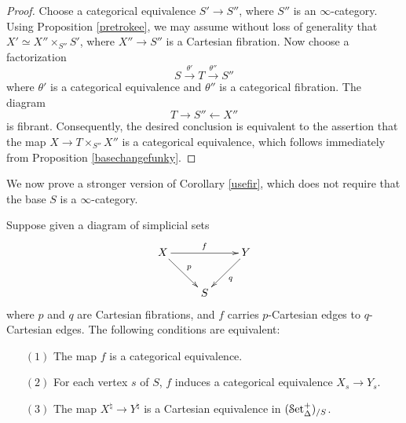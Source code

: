 \begin{proof}
Choose a categorical equivalence $S' \rightarrow S''$, where $S''$ is an $\infty$-category.
Using Proposition \ref{pretrokee}, we may assume without loss of generality that
$X' \simeq X'' \times_{S''} S'$, where $X'' \rightarrow S''$ is a Cartesian fibration. Now choose
a factorization
$$ S \stackrel{\theta'}{\rightarrow} T \stackrel{\theta''}{\rightarrow} S''$$
where $\theta'$ is a categorical equivalence and $\theta''$ is a categorical fibration. 
The diagram
$$ T \rightarrow S'' \leftarrow X''$$ is fibrant. Consequently, the desired conclusion is equivalent to the assertion that the map $X \rightarrow T \times_{S''} X''$ is a categorical equivalence, which follows immediately from Proposition \ref{basechangefunky}.
\end{proof}

We now prove a stronger version of Corollary \ref{usefir}, which does not require that the base $S$ is a $\infty$-category.

\begin{proposition}\label{apple1}
Suppose given a diagram of simplicial sets
$$ \xymatrix{ X \ar[dr]^{p} \ar[rr]^{f} & & Y \ar[dl]^{q} \\
& S & }$$ 
where $p$ and $q$ are Cartesian fibrations, and $f$ carries $p$-Cartesian edges
to $q$-Cartesian edges.
The following conditions are equivalent:
\begin{itemize}
\item[$(1)$] The map $f$ is a categorical equivalence.
\item[$(2)$] For each vertex $s$ of $S$, $f$ induces a categorical equivalence $X_{s} \rightarrow Y_{s}$.
\item[$(3)$] The map $X^{\natural} \rightarrow Y^{\natural}$ is a Cartesian equivalence in
$(\operatorname{\mathcal{S}et_{\Delta}^{+}})_{/S}$. 
\end{itemize}

\end{proposition}

